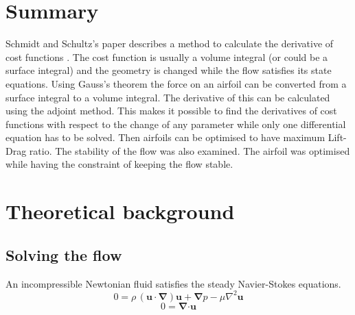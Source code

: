 \documentclass[12pt, a4paper]{article}
\begin{document}
\captionsetup{justification=centering}
\section{Summary}
    Schmidt and Schultz's paper describes a method to calculate the derivative of cost functions \cite{Schmidt_1}. The cost function is usually a volume integral (or could be a surface integral) and the geometry is changed while the flow satisfies its state equations. Using Gauss's theorem the force on an airfoil can be converted from a surface integral to a volume integral. The derivative of this can be calculated using the adjoint method. This makes it possible to find the derivatives of cost functions with respect to the change of any parameter while only one differential equation has to be solved. Then airfoils can be optimised to have maximum Lift-Drag ratio. The stability of the flow was also examined. The airfoil was optimised while having the constraint of keeping the flow stable.
	
\section{Theoretical background}
	\subsection{Solving the flow}
		An incompressible Newtonian fluid satisfies the steady Navier-Stokes equations.
		\begin{equation} \label{NS_1}
						0 = \rho \, (\mathbf{u \cdot} \boldsymbol{\nabla}) \mathbf{u} + \boldsymbol{\nabla} p - 
						\mu \nabla^2 \mathbf{u}
		\end{equation}
		\begin{equation} \label{NS_2}
						0 = \boldsymbol{\nabla} \mathbf{\cdot u}
		\end{equation}
        
\end{document}
